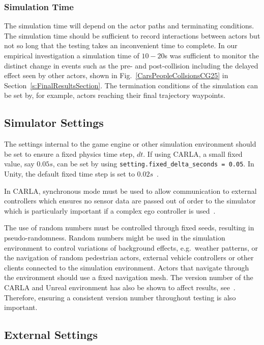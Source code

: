 \subsubsection{Simulation Time} 
The simulation time will depend on the actor paths and terminating conditions. The simulation time should be sufficient to record interactions between actors but not so long that the testing takes an inconvenient time to complete. In our empirical investigation a simulation time of $10-20$s was sufficient to monitor the distinct change in events such as the pre- and post-collision including the delayed effect seen by other actors, shown in Fig.~\ref{CarsPeopleCollsionsCG25} in Section~\ref{s:FinalResultsSection}. The termination conditions of the simulation can be set by, for example, actors reaching their final trajectory waypoints. 

\subsection{Simulator Settings}
The settings internal to the game engine or other simulation environment should be set to ensure a fixed physics time step, $dt$. If using CARLA, a small fixed value, say $0.05s$, can be set by using \texttt{setting.fixed\_delta\_seconds = 0.05}. In Unity, the default fixed time step is set to $0.02s$~\cite{MonoBehaviour_unity}. 

In CARLA, synchronous mode must be used to allow communication to external controllers which ensures no sensor data are passed out of order to the simulator which is particularly important if a complex ego controller is used~\cite{carla_sim_config}. 

The use of random numbers must be controlled through fixed seeds, resulting in pseudo-randomness. Random numbers might be used in the simulation environment to control variations of background effects, e.g.\ weather patterns, or the navigation of random pedestrian actors, external vehicle controllers or other clients connected to the simulation environment. Actors that navigate through the environment should use a fixed navigation mesh. The version number of the CARLA and Unreal environment has also be shown to affect results, see~\cite{TSLUnrealEngineTesting}. Therefore, ensuring a consistent version number throughout testing is also important.

\subsection{External Settings} \label{ego_actor}

